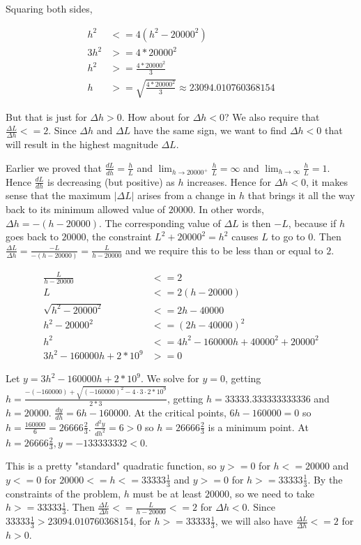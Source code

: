 \documentclass[9pt]{article}
\begin{document}
Squaring both sides,

\begin{align*}
  h^2 &<= 4(h^2 - 20000^2) \\
  3h^2 &>= 4 * 20000^2 \\
  h^2 &>= \frac{4 * 20000^2}{3} \\
  h &>= \sqrt{\frac{4 * 20000^2}{3}} \approx 23094.010760368154
\end{align*}

But that is just for $\Delta h > 0$. How about for $\Delta h < 0$? We also require that $\frac{\Delta L}{\Delta h} <= 2$. Since $\Delta h$ and $\Delta L$ have the same sign, we want to find $\Delta h < 0$ that will result in the highest magnitude $\Delta L$.

Earlier we proved that $\frac{dL}{dh} = \frac{h}{L}$ and $\lim_{h \rightarrow 20000^+} \frac{h}{L} = \infty$ and $\lim_{h \rightarrow \infty} \frac{h}{L} = 1$. Hence $\frac{dL}{dh}$ is decreasing (but positive) as $h$ increases. Hence for $\Delta h < 0$, it makes sense that the maximum $|\Delta L|$ arises from a change in $h$ that brings it all the way back to its minimum allowed value of $20000$. In other words, $\Delta h = -(h - 20000)$. The corresponding value of $\Delta L$ is then $-L$, because if $h$ goes back to $20000$, the constraint $L^2 + 20000^2 = h^2$ causes $L$ to go to $0$. Then $\frac{\Delta L}{\Delta h} = \frac{-L}{-(h - 20000)} = \frac{L}{h - 20000}$ and we require this to be less than or equal to $2$.

\begin{align*}
  \frac{L}{h - 20000} &<= 2 \\
  L &<= 2(h - 20000) \\
  \sqrt{h^2 - 20000^2} &<= 2h - 40000 \\
  h^2 - 20000^2 &<= (2h - 40000)^2 \\
  h^2 &<= 4h^2 - 160000h + 40000^2 + 20000^2 \\
  3h^2 - 160000h + 2*10^9 &>= 0
\end{align*}

Let $y = 3h^2 - 160000h + 2*10^9$. We solve for $y = 0$, getting $h = \frac{-(-160000) + \sqrt{(-160000)^2 - 4 \cdot 3 \cdot 2 * 10^9}}{2 * 3}$, getting $h = 33333.333333333336$ and $h = 20000$. $\frac{dy}{dh} = 6h - 160000$. At the critical points, $6h - 160000 = 0$ so $h = \frac{160000}{6} = 26666 \frac{2}{3}$. $\frac{d^2 y}{dh^2} = 6 > 0$ so $h = 26666 \frac{2}{3}$ is a minimum point. At $h = 26666 \frac{2}{3}, y = -133333332 < 0$.

This is a pretty "standard" quadratic function, so $y >= 0$ for $h <= 20000$ and $y <= 0$ for $20000 <= h <= 33333 \frac{1}{3}$ and $y >= 0$ for $h >= 33333 \frac{1}{3}$. By the constraints of the problem, $h$ must be at least $20000$, so we need to take $h >= 33333 \frac{1}{3}$. Then $\frac{\Delta L}{\Delta h} <= \frac{L}{h - 20000} <= 2$ for $\Delta h < 0$. Since $33333 \frac{1}{3} > 23094.010760368154$, for $h >= 33333 \frac{1}{3}$, we will also have $\frac{\Delta L}{\Delta h} <= 2$ for $h > 0$.
\end{document}
